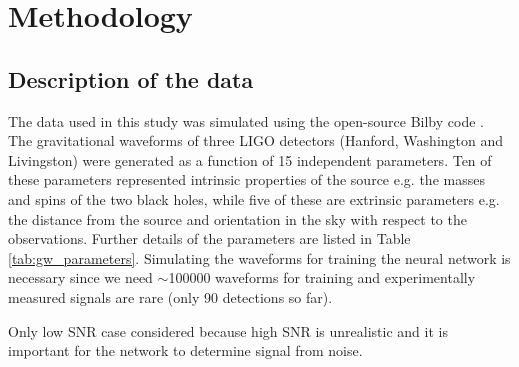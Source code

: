 \section{Methodology}
\label{sec:methodology}


\subsection{Description of the data}

The data used in this study was simulated using the open-source Bilby code \cite{Ashton_Bilby_2019}. The gravitational waveforms of three LIGO detectors (Hanford, Washington and Livingston) were generated as a function of 15 independent parameters. Ten of these parameters represented intrinsic properties of the source e.g. the masses and spins of the two black holes, while five of these are extrinsic parameters e.g. the distance from the source and orientation in the sky with respect to the observations. Further details of the parameters are listed in Table \ref{tab:gw_parameters}. Simulating the waveforms for training the neural network is necessary since we need $\sim$100000 waveforms for training and experimentally measured signals are rare (only 90 detections so far).

Only low SNR case considered because high SNR is unrealistic and it is important for the network to determine signal from noise.


